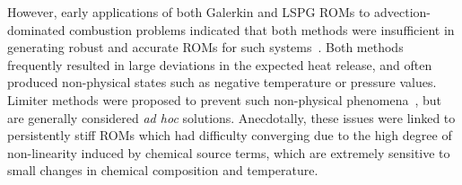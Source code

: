 However, early applications of both Galerkin and LSPG ROMs to advection-dominated combustion problems indicated that both methods were insufficient in generating robust and accurate ROMs for such systems~\cite{Huang2018b,Huang2019}. Both methods frequently resulted in large deviations in the expected heat release, and often produced non-physical states such as negative temperature or pressure values. Limiter methods were proposed to prevent such non-physical phenomena~\cite{Huang2019,Huang2020}, but are generally considered \textit{ad hoc} solutions. Anecdotally, these issues were linked to persistently stiff ROMs which had difficulty converging due to the high degree of non-linearity induced by chemical source terms, which are extremely sensitive to small changes in chemical composition and temperature.